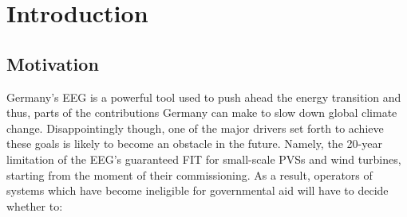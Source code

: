 

\chapter{Introduction}
\label{chp:introduction}

\section{Motivation}
\label{sec:motivation}

Germany's \ac{EEG} is a powerful tool used to push ahead the energy transition and thus, parts of the contributions Germany can make to slow down global climate change. Disappointingly though, one of the major drivers set forth to achieve these goals is likely to become an obstacle in the future. Namely, the 20-year limitation of the \ac{EEG}'s guaranteed \ac{FIT} for small-scale \acp{PVS} and wind turbines, starting from the moment of their commissioning. As a result, operators of systems which have become ineligible for governmental aid will have to decide whether to:

